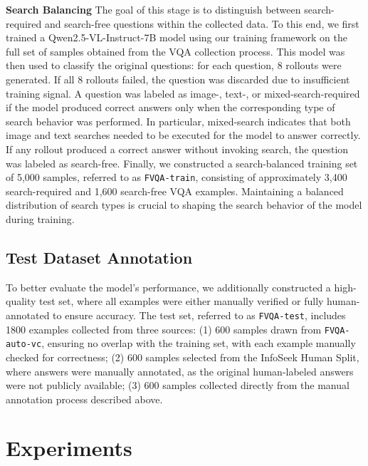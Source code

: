 \documentclass{article}
\begin{document}
\textbf{Search Balancing} The goal of this stage is to distinguish between search-required and search-free questions within the collected data. To this end, we first trained a Qwen2.5-VL-Instruct-7B model using our training framework on the full set of samples obtained from the VQA collection process. This model was then used to classify the original questions: for each question, 8 rollouts were generated. If all 8 rollouts failed, the question was discarded due to insufficient training signal. A question was labeled as image-, text-, or mixed-search-required if the model produced correct answers only when the corresponding type of search behavior was performed. In particular, mixed-search indicates that both image and text searches needed to be executed for the model to answer correctly. If any rollout produced a correct answer without invoking search, the question was labeled as search-free. Finally, we constructed a search-balanced training set of 5,000 samples, referred to as \texttt{FVQA-train}, consisting of approximately 3,400 search-required and 1,600 search-free VQA examples. Maintaining a balanced distribution of search types is crucial to shaping the search behavior of the model during training.

\subsection{Test Dataset Annotation}
To better evaluate the model’s performance, we additionally constructed a high-quality test set, where all examples were either manually verified or fully human-annotated to ensure accuracy. The test set, referred to as \texttt{FVQA-test}, includes 1800 examples collected from three sources: (1) 600 samples drawn from \texttt{FVQA-auto-vc}, ensuring no overlap with the training set, with each example manually checked for correctness; (2) 600 samples selected from the InfoSeek Human Split, where answers were manually annotated, as the original human-labeled answers were not publicly available; (3) 600 samples collected directly from the manual annotation process described above.
\section{Experiments}
\end{document}
